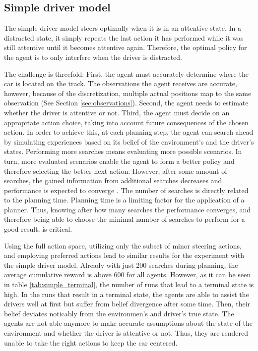 
\subsection{Simple driver model}


The simple driver model steers optimally when it is in an attentive state. In a distracted state, it simply repeats the last action it has performed while it was still attentive until it becomes attentive again. Therefore, the optimal policy for the agent is to only interfere when the driver is distracted. 

The challenge is threefold: First, the agent must accurately determine where the car is located on the track. The observations the agent receives are accurate, however, because of the discretization, multiple actual positions map to the same observation (See Section \ref{sec:observations}). Second, the agent needs to estimate whether the driver is attentive or not. Third, the agent must decide on an appropriate action choice, taking into account future consequences of the chosen action. In order to achieve this, at each planning step, the agent can search ahead by simulating experiences based on its belief of the environment's and the driver's states. Performing more searches means evaluating more possible scenarios. In turn, more evaluated scenarios enable the agent to form a better policy and therefore selecting the better next action. However, after some amount of searches, the gained information from additional searches decreases and performance is expected to converge \parencite{pomcp}. The number of searches is directly related to the planning time. Planning time is a limiting factor for the application of a planner. Thus, knowing after how many searches the performance converges, and therefore being able to choose the minimal number of searches to perform for a good result, is critical.



Using the full action space, utilizing only the subset of minor steering actions, and employing preferred actions lead to similar results for the experiment with the simple driver model. Already with just 200 searches during planning, the average cumulative reward is above 600 for all agents. However, as it can be seen in table \ref{tab:simple_terminal}, the number of runs that lead to a terminal state is high. In the runs that result in a terminal state, the agents are able to assist the drivers well at first but suffer from belief divergence after some time. Then, their belief deviates noticably from the environmen's and driver's true state. The agents are not able anymore to make accurate assumptions about the state of the environment and whether the driver is attentive or not. Thus, they are rendered unable to take the right actions to keep the car centered. 

